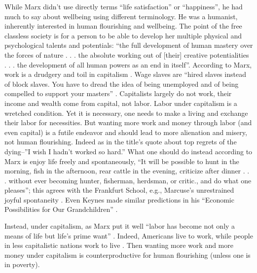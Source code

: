 \documentclass[10pt, letterpaper]{article}
\begin{document}
\begin{spacing}{1.8}
While Marx didn't use directly terms ``life satisfaction'' or ``happiness'', he had
much to say about wellbeing using different terminology. He was a humanist, inherently interested in human flourishing and wellbeing.
The point of the free classless society is for a person to be able to develop
her multiple physical and psychological talents and potentials: ``the full development of human mastery over
the forces of nature . . . the absolute working out of [their] creative
potentialities . . . the development of all human powers as an end in
itself''\citep[cited in][p. 91]{struhl16}.
% 
According to Marx, work is a drudgery and toil in capitalism \citep{marx10, lyons07}.
%
%
Wage slaves are ``hired slaves instead of block slaves. You have to dread the idea of being unemployed and of being compelled to support your masters'' \citep[p. 283][]{goldman03}.
% 
Capitalists largely do not work, their income and
wealth come from capital, not labor. %
Labor under capitalism is a wretched condition. Yet it is necessary, one needs
to make a living and exchange their labor for necessities. But wanting more work
and money through labor (and even capital) is a futile endeavor and should lead to
more alienation and misery, not human flourishing. Indeed as in the title's
quote about top regrets of the dying--''I wish I hadn't worked so hard.''
%
What one should do instead according to Marx is enjoy life freely and
spontaneously, ``It will be possible to hunt in the morning, fish in the
afternoon, rear cattle in the evening, criticize after dinner . . . without ever
becoming hunter, fisherman, herdsman, or critic., and do what one pleases'';
this agrees with the Frankfurt School, e.g., Marcuse's
unrestrained joyful spontaneity \citep{marcuse15}. Even Keynes made similar
predictions in his ``Economic Possibilities for Our Grandchildren'' \citep{keynes30}.

Instead, under capitalism, as Marx put it well ``labor has become not only a
means of life but life's prime want'' \citep[cited in][p. 91]{struhl16}. Indeed, 
Americans live to work, while people in less capitalistic
nations work to live \citep{aokditella}.
Then wanting more work and more money under capitalism is
counterproductive for human flourishing (unless one is in poverty). 


\end{spacing}
\end{document}
